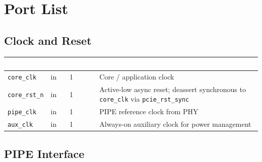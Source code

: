 \documentclass[11pt,a4paper]{article}
\newcommand{\theadcell}[1]{%
  \cellcolor{tablehead}\textcolor{white}{\textbf{#1}}}
\begin{document}
\section{Port List}

\subsection{Clock and Reset}

\begin{tabular}{lllp{7cm}}
  \toprule
  \theadcell{Port} & \theadcell{Dir} & \theadcell{Width} & \theadcell{Description} \\
  \midrule
  \texttt{core\_clk}   & in  & 1 & Core / application clock \\
  \texttt{core\_rst\_n}& in  & 1 & Active-low async reset; deassert synchronous to \texttt{core\_clk} via \texttt{pcie\_rst\_sync} \\
  \texttt{pipe\_clk}   & in  & 1 & PIPE reference clock from PHY \\
  \texttt{aux\_clk}    & in  & 1 & Always-on auxiliary clock for power management \\
  \bottomrule
\end{tabular}

\subsection{PIPE Interface}
\end{document}
